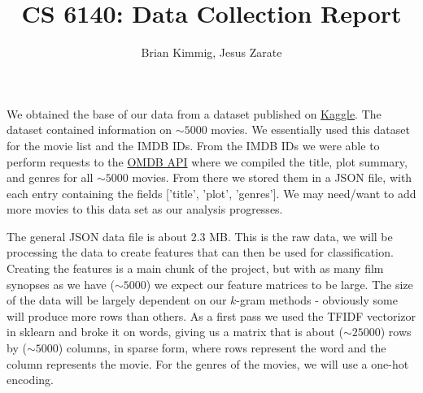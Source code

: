 \documentclass[12pt]{article}
\title{CS 6140: Data Collection Report}
\author{Brian Kimmig, Jesus Zarate}
\date{}
\begin{document}
\maketitle


We obtained the base of our data from a dataset published on \href{https://www.kaggle.com/deepmatrix/imdb-5000-movie-dataset}{Kaggle}. The dataset contained information on $\sim5000$ movies. We essentially used this dataset for the movie list and the IMDB IDs. From the IMDB IDs we were able to perform requests to the \href{https://www.omdbapi.com/}{OMDB API} where we compiled the title, plot summary, and genres for all $\sim5000$ movies. From there we stored them in a JSON file, with each entry containing the fields ['title', 'plot', 'genres']. We may need/want to add more movies to this data set as our analysis progresses.


The general JSON data file is about 2.3 MB. This is the raw data, we will be processing the data to create features that can then be used for classification. Creating the features is a main chunk of the project, but with as many film synopses as we have ($\sim5000$) we expect our feature matrices to be large. The size of the data will be largely dependent on our $k$-gram methods - obviously some will produce more rows than others. As a first pass we used the TFIDF vectorizor in sklearn and broke it on words, giving us a matrix that is about ($\sim25000$) rows by ($\sim5000$) columns, in sparse form, where rows represent the word and the column represents the movie. For the genres of the movies, we will use a one-hot encoding.
\end{document}
